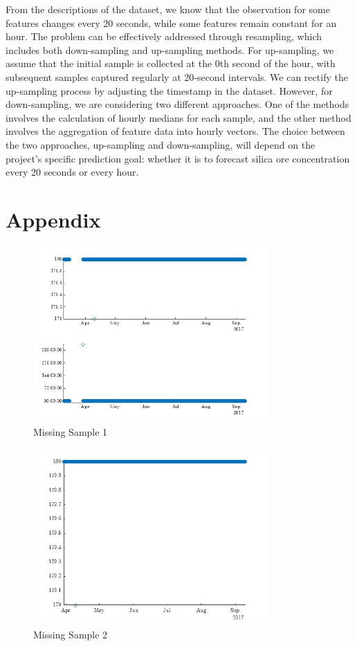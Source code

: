 \documentclass{article}
\begin{document}
From the descriptions of the dataset, we know that the observation for some features changes every 20 seconds, while some features remain constant for an hour. The problem can be effectively addressed through resampling, which includes both down-sampling and up-sampling methods. For up-sampling, we assume that the initial sample is collected at the 0th second of the hour, with subsequent samples captured regularly at 20-second intervals. We can rectify the up-sampling process by adjusting the timestamp in the dataset. However, for down-sampling, we are considering two different approaches. One of the methods involves the calculation of hourly medians for each sample, and the other method involves the aggregation of feature data into hourly vectors. The choice between the two approaches, up-sampling and down-sampling, will depend on the project's specific prediction goal: whether it is to forecast silica ore concentration every 20 seconds or every hour.

\appendix
\section{Appendix}
\begin{figure}[ht] 
  \centering
  \includegraphics[width=0.8\textwidth]{Missing_sample_1.jpg}
  \caption{Missing Sample 1}
  \label{fig:Missing_sample_1}
\end{figure}

\begin{figure}[ht] 
  \centering
  \includegraphics[width=0.8\textwidth]{Missing_sample_2.jpg}
  \caption{Missing Sample 2}
  \label{fig:Missing_sample_2}
\end{figure}
\end{document}
